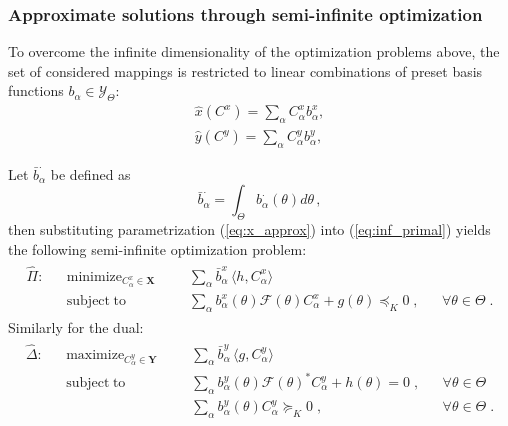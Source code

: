 \documentclass{article}
\newcommand{\ppar}{\theta}                  %
\newcommand{\Ppar}{\Theta}                  %
\newcommand{\Ym}{\bm{\mathcal{Y}}_{\Theta} }
\newcommand{\X}{\mathbf{X}}
\newcommand{\Y}{\mathbf{Y}}
\newcommand{\calF}{\mathcal{F}}
\DeclareMathOperator*{\minimize}{minimize}
\DeclareMathOperator*{\maximize}{maximize}
\DeclareMathOperator*{\subj}{subject\;to}
\begin{document}
\subsubsection*{Approximate solutions through semi-infinite optimization}%

To overcome the infinite dimensionality of the optimization problems above, the set of considered mappings is restricted to linear combinations of preset basis functions $b_\alpha\in\Ym$:
\begin{subequations}\label{eq:xy_approx}
\begin{gather}
\hat{x}(C^x) = \sum_\alpha C^x_\alpha b^x_\alpha, \label{eq:x_approx} \\%
\hat{y}(C^y) = \sum_\alpha C^y_\alpha b^y_\alpha, \label{eq:y_approx}%
\end{gather}
\end{subequations}

Let $\bar{b}_\alpha^\cdot$ be defined as
\[ \bar{b}_\alpha^\cdot = \int_{\Ppar} b_\alpha^\cdot(\ppar) d\ppar  \,,
\]
then substituting parametrization (\ref{eq:x_approx}) into (\ref{eq:inf_primal}) yields the following semi-infinite optimization problem:
\begin{gather}\label{eq:semi-inf_primal}
\begin{aligned}
\hat{\Pi}: && \minimize_{C^x_\alpha\in\X} &&& \sum_\alpha \bar{b}^x_\alpha \, \langle h, C^x_\alpha \rangle\\%
           && \subj                       &&& \sum_\alpha b^x_\alpha(\ppar) \calF(\ppar) C^x_\alpha + g(\ppar)\preceq_K 0 \;, && \forall \ppar\in\Ppar\;.%
\end{aligned}
\end{gather}
Similarly for the dual:
\begin{gather}\label{eq:semi-inf_dual}
\begin{aligned}
\hat{\Delta}: && \maximize_{C^y_\alpha\in\Y} &&& \sum_{\alpha} \bar{b}^y_\alpha \, \langle g , C^y_\alpha \rangle\\%
              && \subj                       &&& \sum_\alpha b^y_\alpha(\ppar) \calF(\ppar)^* C^y_\alpha + h(\ppar)= 0 \;, && \forall \ppar \in\Ppar\\%
              &&                             &&& \sum_\alpha b^y_\alpha(\ppar) C^y_\alpha \succeq_K 0                  \;, && \forall \ppar \in\Ppar\;.%
\end{aligned}
\end{gather}
\end{document}
